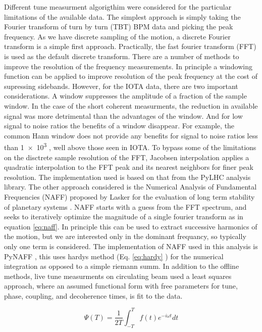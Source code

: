 Different tune measurment algorigthim were considered for the particular limitations of the available data. The simplest approach is simply taking the Fourier transform of turn by turn (TBT) BPM data and picking the peak frequency. As we have discrete sampling of the motion, a discrete Fourier transform is a simple first approach. Practically, the fast fourier transform (FFT) is used as the default discrete transform. There are a number of methods to improve the resolution of the frequency measurements. In principle a windowing function can be applied to improve resolution of the peak frequency at the cost of supressing sidebands. However, for the IOTA data, there are two important considerations. A window suppresses the amplitude of a fraction of the sample window. In the case of the short coherent measurments, the reduction in available signal was more detrimental than the advantages of the window. And for low signal to noise ratios the benefits of a window disappear. For example, the common Hann window does not provide any benefits for signal to noise ratios less than \num{1e3} \cite{bartoliniAlgorithms}, well above those seen in IOTA. To bypass some of the limitations on the disctrete sample resolution of the FFT, Jacobsen interpolation \cite{jacobesnLocla} applies a quadratic interpolation to the FFT peak and its nearest neighbors for finer peak resolution. The implementation used is based on that from the PyLHC \cite{cernomc} analysis library. The other approach considered is the Numerical Analysis of Fundamental Frequencies (NAFF) proposed by Lasker for the evaluation of long term stability of planetary systems \cite{laskar}. NAFF starts with a guess from the FFT spectrum, and seeks to iteratively optimize the magnitude of a single fourier transform as in equation \ref{eq:naff}. In principle this can be used to extract successive harmonics of the motion, but we are interested only in the dominant frequancy, so typically only one term is considered. The implementation of NAFF used in this analysis is PyNAFF \cite{zisopolusPZ}, this uses hardys method (Eq. \ref{eq:hardy} \cite[p.151]{whitakerCalculs}) for the numerical integration as opposed to a simple riemann summ. In addition to the offline methods, live tune measurments on circulating beam used a least squares approach, where an assumed functional form with free parameters for tune, phase, coupling, and decoherence times, is fit to the data.

\begin{equation}
	\Psi(T) = \frac{1}{2T}\int_{-T}^{T}f(t)e^{-i\omega t}dt
	\label{eq:naff}
\end{equation}

